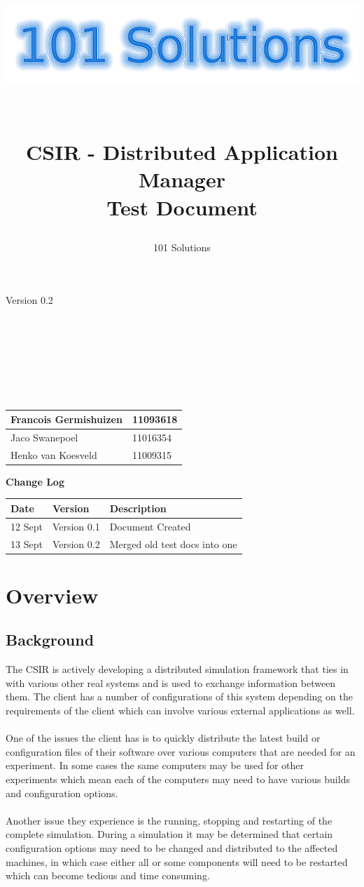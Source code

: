 \documentclass[a4paper,12pt,final]{article}
\title{
\begin{center}
  	\includegraphics[scale=0.3]{101Logo.png} 
  \end{center}
  \textbf{\\}
CSIR - Distributed Application Manager\\
Test Document\\
}
\author{101 Solutions}
\begin{document}
\maketitle
\begin{center}
Version 0.2
\end{center}
\textbf{\\}
\textbf{\\}
\textbf{\\}
\textbf{\\}
\textbf{\\}
\textbf{\\}
\begin{center}
\begin{tabular}{|l|l|}
\hline
Francois Germishuizen & 11093618\\
\hline
Jaco Swanepoel & 11016354\\
\hline
Henko van Koesveld & 11009315\\
\hline
\end{tabular}
\end{center}
\thispagestyle{empty}
\newpage
\thispagestyle{empty}
\textbf{\large{Change Log}}
\vspace{6pt}\newline
\begin{tabular}{|l|l|l|}
\hline
Date & Version & Description\\
\hline
12 Sept & Version 0.1 & Document Created\\
\hline
13 Sept & Version 0.2 & Merged old test docs into one\\
\hline
\end{tabular}
\newpage
\tableofcontents
\thispagestyle{empty}
\newpage

\section{Overview}
\subsection{Background}
The CSIR is actively developing a distributed simulation framework that ties
in with various other real systems and is used to exchange information
between them. The client has a number of configurations of this system
depending on the requirements of the client which can involve various
external applications as well.\\
\textbf{\\}
One of the issues the client has is to quickly distribute the latest build or
configuration files of their software over various computers that are needed
for an experiment. In some cases the same computers may be used for other
experiments which mean each of the computers may need to have various
builds and configuration options.\\
\textbf{\\}
Another issue they experience is the running, stopping and restarting of
the complete simulation. During a simulation it may be determined that
certain configuration options may need to be changed and distributed to the
affected machines, in which case either all or some components will need to
be restarted which can become tedious and time consuming.
\end{document}

